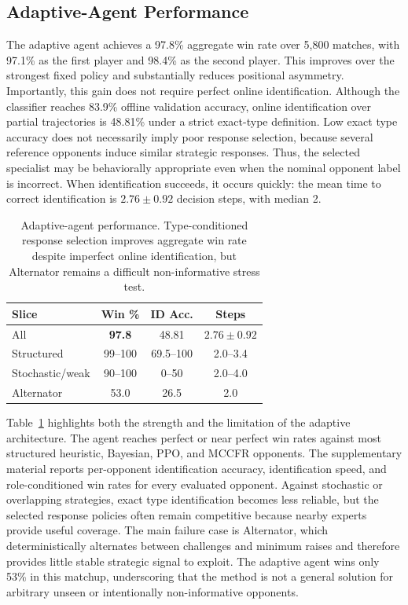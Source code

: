 \documentclass{article}
\begin{document}
\subsection{Adaptive-Agent Performance}
The adaptive agent achieves a 97.8\% aggregate win rate over 5{,}800 matches, with 97.1\% as the first player and 98.4\% as the second player. This improves over the strongest fixed policy and substantially reduces positional asymmetry. Importantly, this gain does not require perfect online identification. Although the classifier reaches 83.9\% offline validation accuracy, online identification over partial trajectories is 48.81\% under a strict exact-type definition. Low exact type accuracy does not necessarily imply poor response selection, because several reference opponents induce similar strategic responses. Thus, the selected specialist may be behaviorally appropriate even when the nominal opponent label is incorrect. When identification succeeds, it occurs quickly: the mean time to correct identification is $2.76 \pm 0.92$ decision steps, with median 2.


\begin{table}[t]
\centering
\small
\begin{tabular}{@{}lccc@{}}
\toprule
Slice & Win \% & ID Acc. & Steps \\
\midrule
All & \textbf{97.8} & 48.81 & $2.76\pm0.92$ \\
Structured & 99--100 & 69.5--100 & 2.0--3.4 \\
Stochastic/weak & 90--100 & 0--50 & 2.0--4.0 \\
Alternator & 53.0 & 26.5 & 2.0 \\
\bottomrule
\end{tabular}
\caption{Adaptive-agent performance. Type-conditioned response selection improves aggregate win rate despite imperfect online identification, but Alternator remains a difficult non-informative stress test.}
\label{tab:adaptive_summary}
\end{table}

Table~\ref{tab:adaptive_summary} highlights both the strength and the limitation of the adaptive architecture. The agent reaches perfect or near perfect win rates against most structured heuristic, Bayesian, PPO, and MCCFR opponents. The supplementary material reports per-opponent identification accuracy, identification speed, and role-conditioned win rates for every evaluated opponent. Against stochastic or overlapping strategies, exact type identification becomes less reliable, but the selected response policies often remain competitive because nearby experts provide useful coverage. The main failure case is Alternator, which deterministically alternates between challenges and minimum raises and therefore provides little stable strategic signal to exploit. The adaptive agent wins only 53\% in this matchup, underscoring that the method is not a general solution for arbitrary unseen or intentionally non-informative opponents.
\end{document}
